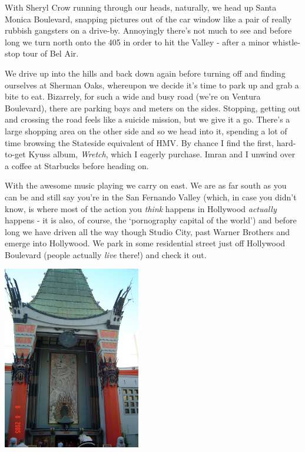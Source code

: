 \documentclass[a5paper,titlepage,11pt,draft]{book}
\begin{document}
With Sheryl Crow running through our heads, naturally, we head up Santa Monica Boulevard, snapping pictures out of the car window like a pair of really rubbish gangsters on a drive-by.  Annoyingly there's not much to see and before long we turn north onto the 405 in order to hit the Valley - after a minor whistle-stop tour of Bel Air.

We drive up into the hills and back down again before turning off and finding ourselves at Sherman Oaks, whereupon we decide it's time to park up and grab a bite to eat.  Bizarrely, for such a wide and busy road (we're on Ventura Boulevard), there are parking bays and meters on the sides.  Stopping, getting out and crossing the road feels like a suicide mission, but we give it a go.  There's a large shopping area on the other side and so we head into it, spending a lot of time browsing the Stateside equivalent of HMV.  By chance I find the first, hard-to-get Kyuss album, \emph{Wretch}, which I eagerly purchase.  Imran and I unwind over a coffee at Starbucks before heading on.

With the awesome music playing we carry on east.  We are as far south as you can be and still say you're in the San Fernando Valley (which, in case you didn't know, is where most of the action you \emph{think} happens in Hollywood \emph{actually} happens - it is also, of course, the `pornography capital of the world') and before long we have driven all the way though Studio City, past Warner Brothers and emerge into Hollywood.  We park in some residential street just off Hollywood Boulevard (people actually \emph{live} there!) and check it out.

\begin{center}\includegraphics[height=80mm]{gfx/DSC00806}\end{center}
\end{document}
